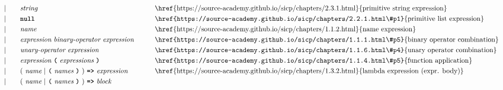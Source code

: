 \begin{alignat*}{9}
&&                       && |   &\quad &&  \textit{string}   && \textrm{\href{https://source-academy.github.io/sicp/chapters/2.3.1.html}{primitive string expression}} \\
&&                       && |   &\quad && \textbf{\texttt{null}}
                                                           && \textrm{\href{https://source-academy.github.io/sicp/chapters/2.2.1.html\#p1}{primitive list expression}} \\
&&                       && |   &\quad &&  \textit{name}   && \textrm{\href{https://source-academy.github.io/sicp/chapters/1.1.2.html}{name expression}} \\
&&                       && |   &\quad &&  \textit{expression} \  \textit{binary-operator} \ 
                                            \textit{expression} \qquad
                                                           && \textrm{\href{https://source-academy.github.io/sicp/chapters/1.1.1.html\#p5}{binary operator combination}} \\
&&                       && |   &\quad &&   \textit{unary-operator} \ 
                                            \textit{expression}
                                                           && \textrm{\href{https://source-academy.github.io/sicp/chapters/1.1.6.html\#p4}{unary operator combination}}\\
&&                       && |   &\quad &&   \textit{expression} \ 
                                            \textbf{\texttt{(}}\ \textit{expressions}\
                                            \textbf{\texttt{)}}
                                                           && \textrm{\href{https://source-academy.github.io/sicp/chapters/1.1.4.html\#p5}{function application}} \\
&&                       && |   &\quad &&   (\ \textit{name}\ | \
                                               \textbf{\texttt{(}}\ \textit{names}\ \textbf{\texttt{)}}\
                                            )\    
                                            \texttt{\textbf{=>}}\ \textit{expression}
                                                           && \textrm{\href{https://source-academy.github.io/sicp/chapters/1.3.2.html}{lambda expression (expr. body)}} \\
&&                       && |   &\quad &&   (\ \textit{name}\ | \
                                               \textbf{\texttt{(}}\ \textit{names}\ \textbf{\texttt{)}}\
                                            )\    
                                            \texttt{\textbf{=>}}\ \textit{block}

\end{alignat*}
